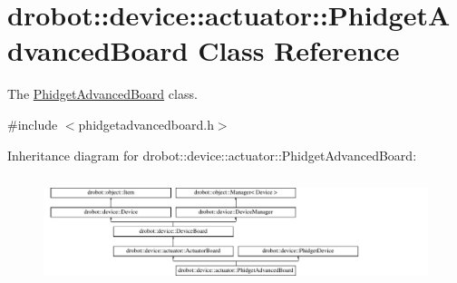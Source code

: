 \hypertarget{classdrobot_1_1device_1_1actuator_1_1PhidgetAdvancedBoard}{\section{drobot\-:\-:device\-:\-:actuator\-:\-:Phidget\-Advanced\-Board Class Reference}
\label{classdrobot_1_1device_1_1actuator_1_1PhidgetAdvancedBoard}
}


The \hyperlink{classdrobot_1_1device_1_1actuator_1_1PhidgetAdvancedBoard}{Phidget\-Advanced\-Board} class.  




{\ttfamily \#include $<$phidgetadvancedboard.\-h$>$}

Inheritance diagram for drobot\-:\-:device\-:\-:actuator\-:\-:Phidget\-Advanced\-Board\-:\begin{figure}[H]
\begin{center}
\leavevmode
\includegraphics[height=3.196347cm]{classdrobot_1_1device_1_1actuator_1_1PhidgetAdvancedBoard}
\end{center}
\end{figure}
